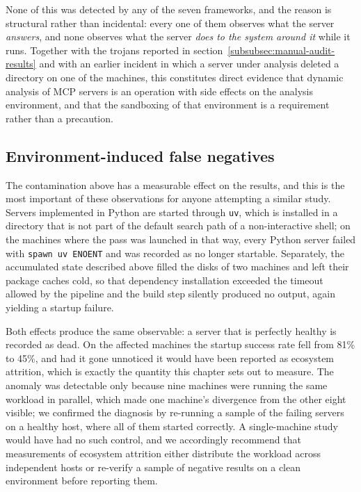 None of this was detected by any of the seven frameworks, and the reason is
structural rather than incidental: every one of them observes what the server
\emph{answers}, and none observes what the server \emph{does to the system around
it} while it runs. Together with the trojans reported in
section~\ref{subsubsec:manual-audit-results} and with an earlier incident in which
a server under analysis deleted a directory on one of the machines, this
constitutes direct evidence that dynamic analysis of MCP servers is an operation
with side effects on the analysis environment, and that the sandboxing of that
environment is a requirement rather than a precaution.

\subsection{Environment-induced false negatives}

The contamination above has a measurable effect on the results, and this is the
most important of these observations for anyone attempting a similar study.
Servers implemented in Python are started through \texttt{uv}, which is installed
in a directory that is not part of the default search path of a non-interactive
shell; on the machines where the pass was launched in that way, every Python
server failed with \texttt{spawn uv ENOENT} and was recorded as no longer
startable. Separately, the accumulated state described above filled the disks of
two machines and left their package caches cold, so that dependency installation
exceeded the timeout allowed by the pipeline and the build step silently produced
no output, again yielding a startup failure.

Both effects produce the same observable: a server that is perfectly healthy is
recorded as dead. On the affected machines the startup success rate fell from 81\%
to 45\%, and had it gone unnoticed it would have been reported as ecosystem
attrition, which is exactly the quantity this chapter sets out to measure. The
anomaly was detectable only because nine machines were running the same workload
in parallel, which made one machine's divergence from the other eight visible; we
confirmed the diagnosis by re-running a sample of the failing servers on a healthy
host, where all of them started correctly. A single-machine study would have had
no such control, and we accordingly recommend that measurements of ecosystem
attrition either distribute the workload across independent hosts or re-verify a
sample of negative results on a clean environment before reporting them.

